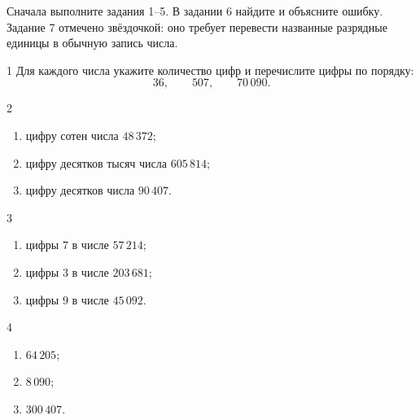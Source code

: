 
\studentline

\begin{routebox}
  Сначала выполните задания 1--5. В задании 6 найдите и объясните ошибку.
  Задание 7 отмечено звёздочкой: оно требует перевести названные разрядные
  единицы в обычную запись числа.
\end{routebox}

\begin{homeworktask}{1}
  Для каждого числа укажите количество цифр и перечислите цифры по порядку:
  \[
    36,\qquad 507,\qquad 70\,090.
  \]
  \answerspace{30mm}
\end{homeworktask}

\begin{homeworktask}{2}
  \begin{enumerate}
    \item цифру сотен числа \(48\,372\);
    \item цифру десятков тысяч числа \(605\,814\);
    \item цифру десятков числа \(90\,407\).
  \end{enumerate}
  \answerspace{26mm}
\end{homeworktask}

\begin{homeworktask}{3}
  \begin{enumerate}
    \item цифры \(7\) в числе \(57\,214\);
    \item цифры \(3\) в числе \(203\,681\);
    \item цифры \(9\) в числе \(45\,092\).
  \end{enumerate}
  \answerspace{27mm}
\end{homeworktask}

\begin{homeworktask}{4}
  \begin{enumerate}
    \item \(64\,205\);
    \item \(8\,090\);
    \item \(300\,407\).
  \end{enumerate}
  \answerspace{34mm}
\end{homeworktask}

